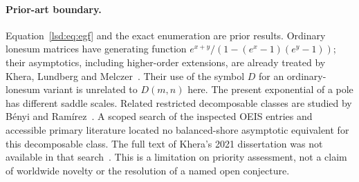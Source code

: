 \documentclass[11pt]{article}
\theoremstyle{remark}\newtheorem{remark}{Remark}
\begin{document}
\paragraph{Prior-art boundary.}
Equation~\eqref{lsd:eq:egf} and the exact enumeration are prior results. Ordinary lonesum matrices have generating function
$e^{x+y}/(1-(e^x-1)(e^y-1))$; their asymptotics, including higher-order extensions, are already treated by Khera, Lundberg and Melczer~\cite{KLM}. Their use of the symbol $D$ for an ordinary-lonesum variant is unrelated to $D(m,n)$ here. The present exponential of a pole has different saddle scales. Related restricted decomposable classes are studied by B\'enyi and Ram\'irez~\cite{BMRW}. A scoped search of the inspected OEIS entries and accessible primary literature located no balanced-shore asymptotic equivalent for this decomposable class. The full text of Khera's 2021 dissertation was not available in that search~\cite{KheraThesis}. This is a limitation on priority assessment, not a claim of worldwide novelty or the resolution of a named open conjecture.
\end{document}
